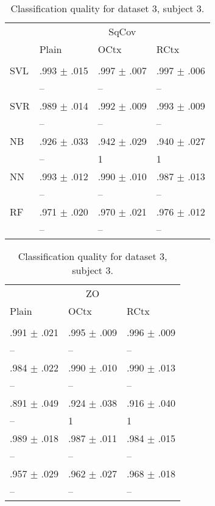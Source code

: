 \begin{table}[htb]
\renewcommand{\arraystretch}{0.6}
\centering
\footnotesize
\caption{Classification quality for dataset 3, subject 3.\label{table:Set3_patient3_res}}
\begin{tabular}{llll}
 & \multicolumn{3}{c}{SqCov} \\
 & Plain & OCtx & RCtx \\
 \cmidrule(lr){2-4}\\
SVL & .993 $\pm$ .015 & .997 $\pm$ .007 & .997 $\pm$ .006 \\
 & -- & -- & -- \\
SVR & .989 $\pm$ .014 & .992 $\pm$ .009 & .993 $\pm$ .009 \\
 & -- & -- & -- \\
NB & .926 $\pm$ .033 & .942 $\pm$ .029 & .940 $\pm$ .027 \\
 & -- & {\scriptsize 1} & {\scriptsize 1} \\
NN & .993 $\pm$ .012 & .990 $\pm$ .010 & .987 $\pm$ .013 \\
 & -- & -- & -- \\
RF & .971 $\pm$ .020 & .970 $\pm$ .021 & .976 $\pm$ .012 \\
 & -- & -- & -- \\
\end{tabular}%
\begin{tabular}{lll}
  \multicolumn{3}{c}{ZO} \\
  Plain & OCtx & RCtx \\
  \cmidrule(lr){1-3}\\
 .991 $\pm$ .021 & .995 $\pm$ .009 & .996 $\pm$ .009 \\
  -- & -- & -- \\
 .984 $\pm$ .022 & .990 $\pm$ .010 & .990 $\pm$ .013 \\
  -- & -- & -- \\
 .891 $\pm$ .049 & .924 $\pm$ .038 & .916 $\pm$ .040 \\
  -- & {\scriptsize 1} & {\scriptsize 1} \\
 .989 $\pm$ .018 & .987 $\pm$ .011 & .984 $\pm$ .015 \\
  -- & -- & -- \\
 .957 $\pm$ .029 & .962 $\pm$ .027 & .968 $\pm$ .018 \\
  -- & -- & -- \\
\end{tabular}
\end{table}

